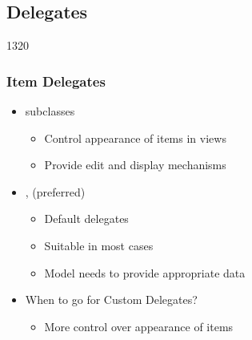 %
%
%
%

\subsection {Delegates}

\begin{slide}{1320}
  \frametitle{ Item Delegates}
  \begin{itemize}
 \item {} subclasses
    \begin{itemize}
    \item Control appearance of items in views
    \item Provide edit and display mechanisms
   \end{itemize}
  \item {},  (preferred)
    \begin{itemize}
    \item Default delegates
    \item Suitable in most cases
    \item Model needs to provide appropriate data
    \end{itemize}
    \medskip
  \item When to go for Custom Delegates?
    \begin{itemize}
    \item More control over appearance of items
    \end{itemize}
  \end{itemize}
\end{slide}


